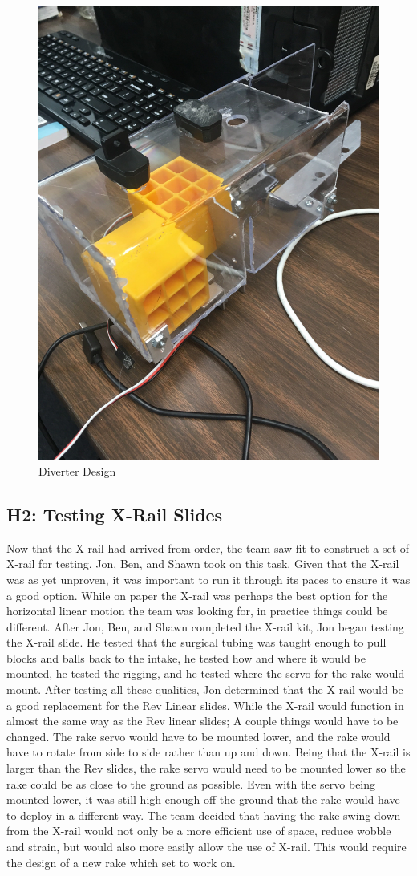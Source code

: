 \documentclass{article}
\begin{document}
\begin{figure}
    \centering
    \includegraphics[width=.6 \textwidth]{15_12-10/images/Diverter.jpg}
    \caption{Diverter Design}
    \label{fig:diverter}
\end{figure}

\subsection{H2: Testing X-Rail Slides}

Now that the X-rail had arrived from order, the team saw fit to construct a set of X-rail for testing. Jon, Ben, and Shawn took on this task. Given that the X-rail was as yet unproven, it was important to run it through its paces to ensure it was a good option. While on paper the X-rail was perhaps the best option for the horizontal linear motion the team was looking for, in practice things could be different. After Jon, Ben, and Shawn completed the X-rail kit, Jon began testing the X-rail slide. He tested that the surgical tubing was taught enough to pull blocks and balls back to the intake, he tested how and where it would be mounted, he tested the rigging, and he tested where the servo for the rake would mount. After testing all these qualities, Jon determined that the X-rail would be a good replacement for the Rev Linear slides. While the X-rail would function in almost the same way as the Rev linear slides; A couple things would have to be changed. The rake servo would have to be mounted lower, and the rake would have to rotate from side to side rather than up and down. Being that the X-rail is larger than the Rev slides, the rake servo would need to be mounted lower so the rake could be as close to the ground as possible. Even with the servo being mounted lower, it was still high enough off the ground that the rake would have to deploy in a different way. The team decided that having the rake swing down from the X-rail would not only be a more efficient use of space, reduce wobble and strain, but would also more easily allow the use of X-rail. This would require the design of a new rake which set to work on. 
\end{document}
